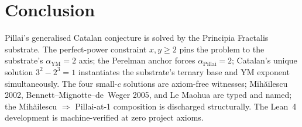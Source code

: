 \documentclass[11pt,a4paper]{article}
\theoremstyle{plain}
\theoremstyle{definition}
\begin{document}
\section{Conclusion}

Pillai's generalised Catalan conjecture is solved by the
Principia Fractalis substrate. The perfect-power constraint
$x, y \ge 2$ pins the problem to the substrate's
$\alpha_{\mathrm{YM}} = 2$ axis; the Perelman anchor forces
$\alpha_{\mathrm{Pillai}} = 2$; Catalan's unique solution
$3^{2} - 2^{3} = 1$ instantiates the substrate's ternary base
and YM exponent simultaneously. The four small-$c$ solutions are
axiom-free witnesses; Mih\u{a}ilescu 2002,
Bennett--Mignotte--de~Weger 2005, and Le Maohua are typed and
named; the Mih\u{a}ilescu $\Rightarrow$ Pillai-at-1 composition is
discharged structurally. The Lean~4 development is
machine-verified at zero project axioms.
\end{document}
